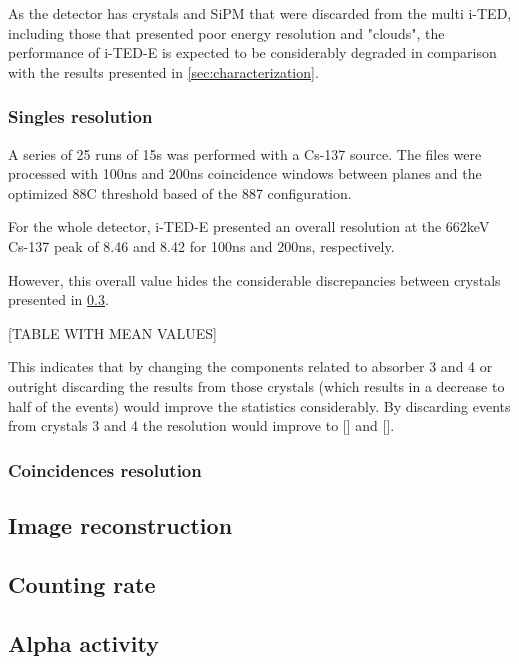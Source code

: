 As the detector has crystals and \ac{SiPM} that were discarded from the multi \ac{i-TED}, including those that presented poor energy resolution and "clouds", the performance of \ac{i-TED}-E is expected to be considerably degraded in comparison with the results presented in \ref{sec:characterization}.

\subsubsection{Singles resolution}

A series of 25 runs of 15s was performed with a Cs-137 source. The files were processed with 100ns and 200ns coincidence windows between planes and the optimized 88C threshold based of the 887 configuration.

For the whole detector, \ac{i-TED}-E presented an overall resolution at the 662keV Cs-137 peak of 8.46 and 8.42 for 100ns and 200ns, respectively.

However, this overall value hides the considerable discrepancies between crystals presented in \ref{}.

[TABLE WITH MEAN VALUES]

This indicates that by changing the components related to absorber 3 and 4 or outright discarding the results from those crystals (which results in a decrease to half of the events) would improve the statistics considerably. By discarding events from crystals 3 and 4 the resolution would improve to [] and [].

\subsubsection{Coincidences resolution}

\subsection{Image reconstruction}

\subsection{Counting rate}

\subsection{Alpha activity}

